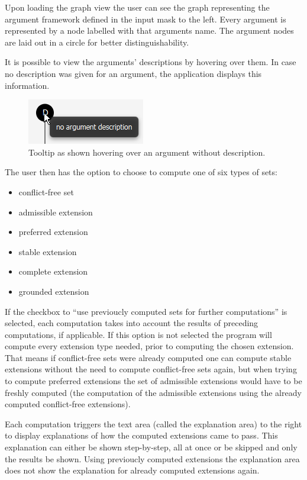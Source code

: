 \documentclass[draft,final]{vutinfth} %
\newcommand{\hl}{\par\vspace{6pt}} %
\begin{document}
Upon loading the graph view the user can see the graph representing the argument framework defined in the input mask to the left. Every argument is represented by a node labelled with that arguments name. The argument nodes are laid out in a circle for better distinguishability.\hl
It is possible to view the arguments' descriptions by hovering over them. In case no description was given for an argument, the application displays this information.\hl

\FloatBarrier
	\begin{figure}[!h]
		\centering
		\includegraphics[scale=2]{pics/argdes.png}
		\caption{Tooltip as shown hovering over an argument without description.}
	\end{figure}
\FloatBarrier

The user then has the option to choose to compute one of six types of sets:

\begin{itemize}[noitemsep]
	\item conflict-free set
	\item admissible extension
	\item preferred extension
	\item stable extension
	\item complete extension
	\item grounded extension
\end{itemize}

If the checkbox to ``use previoucly computed sets for further computations'' is selected, each computation takes into account the results of preceding computations, if applicable. If this option is not selected the program will compute every extension type needed, prior to computing the chosen extension.\\
That means if conflict-free sets were already computed one can compute stable extensions without the need to compute conflict-free sets again, but when trying to compute preferred extensions the set of admissible extensions would have to be freshly computed (the computation of the admissible extensions using the already computed conflict-free extensions).\hl
Each computation triggers the text area (called the explanation area) to the right to display explanations of how the computed extensions came to pass. This explanation can either be shown step-by-step, all at once or be skipped and only the results be shown. Using previoucly computed extensions the explanation area does not show the explanation for already computed extensions again.
\end{document}
